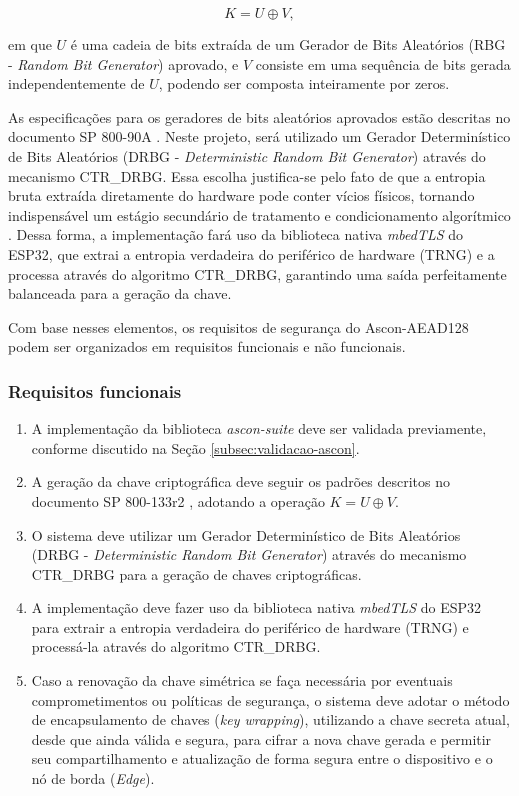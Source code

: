 \[
K = U \oplus V,
\]

em que $U$ é uma cadeia de bits extraída de um Gerador de Bits Aleatórios (RBG - \textit{Random Bit Generator}) aprovado, e $V$ consiste em uma sequência de bits gerada independentemente de $U$, podendo ser composta inteiramente por zeros.

As especificações para os geradores de bits aleatórios aprovados estão descritas no documento SP 800-90A . Neste projeto, será utilizado um Gerador Determinístico de Bits Aleatórios (DRBG - \textit{Deterministic Random Bit Generator}) através do mecanismo CTR\_DRBG. Essa escolha justifica-se pelo fato de que a entropia bruta extraída diretamente do hardware pode conter vícios físicos, tornando indispensável um estágio secundário de tratamento e condicionamento algorítmico \cite{turan2018nist90b}. Dessa forma, a implementação fará uso da biblioteca nativa \textit{mbedTLS} do ESP32, que extrai a entropia verdadeira do periférico de hardware (TRNG) e a processa através do algoritmo CTR\_DRBG, garantindo uma saída perfeitamente balanceada para a geração da chave.

Com base nesses elementos, os requisitos de segurança do Ascon-AEAD128 podem ser organizados em requisitos funcionais e não funcionais.

\subsubsection{Requisitos funcionais}

\begin{enumerate}
    \item[RF1.] A implementação da biblioteca \textit{ascon-suite} deve ser validada previamente, conforme discutido na Seção \ref{subsec:validacao-ascon}.

    \item[RF2.] A geração da chave criptográfica deve seguir os padrões descritos no documento SP 800-133r2 , adotando a operação $K = U \oplus V$.

    \item[RF3.] O sistema deve utilizar um Gerador Determinístico de Bits Aleatórios (DRBG - \textit{Deterministic Random Bit Generator}) através do mecanismo CTR\_DRBG para a geração de chaves criptográficas.

    \item[RF4.] A implementação deve fazer uso da biblioteca nativa \textit{mbedTLS} do ESP32 para extrair a entropia verdadeira do periférico de hardware (TRNG) e processá-la através do algoritmo CTR\_DRBG.

    \item[RF5.] Caso a renovação da chave simétrica se faça necessária por eventuais comprometimentos ou políticas de segurança, o sistema deve adotar o método de encapsulamento de chaves (\textit{key wrapping}), utilizando a chave secreta atual, desde que ainda válida e segura, para cifrar a nova chave gerada e permitir seu compartilhamento e atualização de forma segura entre o dispositivo e o nó de borda (\textit{Edge}).
\end{enumerate}

